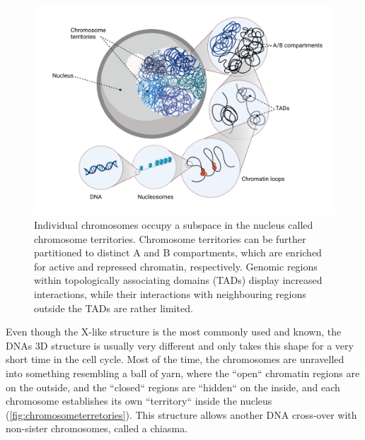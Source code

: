 \begin{figure}[!ht]
\centering
\includegraphics[width=0.9\linewidth]{Figures/intro/ChromosomeTerritories}
\caption[Overview DNA structure]{Individual chromosomes occupy a subspace in the nucleus called chromosome territories. Chromosome territories can be further partitioned to distinct A and B compartments, which are enriched for active and repressed chromatin, respectively. Genomic regions within topologically associating domains (TADs) display increased interactions, while their interactions with neighbouring regions outside the TADs are rather limited.}\label{fig:chromosometerretories}
\end{figure}

Even though the X-like structure is the most commonly used and known, the DNAs 3D structure is usually very different and only takes this shape for a very short time in the cell cycle. Most of the time, the chromosomes are unravelled into something resembling a ball of yarn, where the ``open`` chromatin regions are on the outside, and the ``closed`` regions are ``hidden`` on the inside, and each chromosome establishes its own ``territory`` inside the nucleus (\autoref{fig:chromosometerretories}). This structure allows another DNA cross-over with non-sister chromosomes, called a chiasma.

